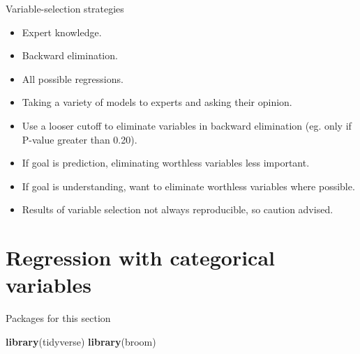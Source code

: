 \documentclass[ignorenonframetext,]{beamer}
\newenvironment{Shaded}{\begin{snugshade}}{\end{snugshade}}
\newcommand{\KeywordTok}[1]{\textcolor[rgb]{0.13,0.29,0.53}{\textbf{#1}}}
\newcommand{\NormalTok}[1]{#1}
\providecommand{\tightlist}{%
  \setlength{\itemsep}{0pt}\setlength{\parskip}{0pt}}
\begin{document}
\begin{frame}{Variable-selection strategies}
\protect\hypertarget{variable-selection-strategies}{}

\begin{itemize}
\tightlist
\item
  Expert knowledge.
\item
  Backward elimination.
\item
  All possible regressions.
\item
  Taking a variety of models to experts and asking their opinion.
\item
  Use a looser cutoff to eliminate variables in backward elimination
  (eg. only if P-value greater than 0.20).
\item
  If goal is prediction, eliminating worthless variables less important.
\item
  If goal is understanding, want to eliminate worthless variables where
  possible.
\item
  Results of variable selection not always reproducible, so caution
  advised.
\end{itemize}

\end{frame}

\hypertarget{regression-with-categorical-variables}{%
\section{Regression with categorical
variables}\label{regression-with-categorical-variables}}

\begin{frame}[fragile]{Packages for this section}
\protect\hypertarget{packages-for-this-section-7}{}

\begin{Shaded}
\begin{Highlighting}[]
\KeywordTok{library}\NormalTok{(tidyverse)}
\KeywordTok{library}\NormalTok{(broom)}
\end{Highlighting}
\end{Shaded}

\end{frame}
\end{document}
